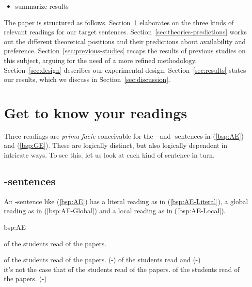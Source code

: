 \documentclass[fleqn,reqno,10pt,draft]{article}
\newcommand{\lit}{\acro{lit}}
\newcommand{\glb}{\acro{glb}}
\newcommand{\loc}{\acro{loc}}
\newcommand{\as}{\acro{as}}
\renewcommand{\es}{\acro{es}}
\begin{document}
\begin{itemize}
\item summarize results
\end{itemize}

The paper is structured as follows. Section~\ref{sec:get-know-your}
elaborates on the three kinds of relevant readings for our target
sentences. Section~\ref{sec:theories-predictions} works out the
different theoretical positions and their predictions about
availability and preference. Section~\ref{sec:previous-studies} recaps
the results of previous studies on this subject, arguing for the need
of a more refined methodology. Section~\ref{sec:design} describes our
experimental design. Section~\ref{sec:results} states our results,
which we discuss in Section~\ref{sec:discussion}.

\section{Get to know your readings}
\label{sec:get-know-your}

Three readings are \emph{prima facie} conceivable for the \as- and
\es-sentences in (\ref{bsp:AE}) and (\ref{bsp:GE}). These are
logically distinct, but also logically dependent in intricate ways. To
see this, let us look at each kind of sentence in turn.

\subsection{\as-sentences}
\label{sec:as-sentences}

An \as-sentence like (\ref{bsp:AE}) has a literal reading as in
(\ref{bsp:AE-Literal}), a global reading as in (\ref{bsp:AE-Global})
and a local reading as in (\ref{bsp:AE-Local}).

\begin{exer}{bsp:AE}

  \ex {} of the students read {} of the
  papers. 

  \begin{xlist}
  \ex {} of the students read
    {} of the papers. \hfill (\as-\lit)
  \ex
     of the students read  
    and  \hfill (\as-\glb)\\
    it's not the case that  of the students read  of the papers.
  \ex
     of the students read {} of the
    papers. \hfill (\as-\loc)
  \end{xlist}
\end{exer}
\end{document}
